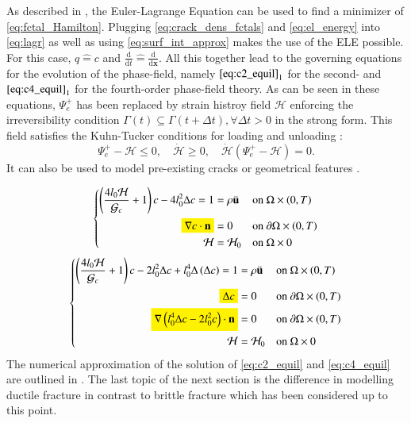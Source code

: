 As described in , the Euler-Lagrange Equation can be used to find a minimizer of \eqref{eq:fctal_Hamilton}. Plugging \eqref{eq:crack_dens_fctals} and \eqref{eq:el_energy} into \eqref{eq:lagr} as well as using \eqref{eq:surf_int_approx} makes the use of the ELE possible. For this case, $q\hat{=}c$ and $\frac{\mathrm{d}}{\mathrm{d}t}\hat{=}\frac{\mathrm{d}}{\mathrm{d}\mathbf{x}}$. All this together lead to the governing equations for the evolution of the phase-field, namely $\eqref{eq:c2_equil}_{1}$ for the second- and $\eqref{eq:c4_equil}_{1}$ for the fourth-order phase-field theory. As can be seen in these equations, $\Psi_{e}^{+}$ has been replaced by strain histroy field $\mathcal{H}$ enforcing the irreversibility condition $\Gamma\left(t\right)\subseteq\Gamma\left(t+\Delta t\right), \forall \Delta t>0$ in the strong form. This field satisfies the Kuhn-Tucker conditions for loading and unloading \cite{01_PF_dyn_brittle}:
\begin{equation} \label{eq:KuhnTucker}
	\Psi_{e}^{+}-\mathcal{H}\leq0, \quad \dot{\mathcal{H}}\geq0, \quad \dot{\mathcal{H}}\left(\Psi_{e}^{+}-\mathcal{H}\right)=0.
\end{equation}
It can also be used to model pre-existing cracks or geometrical features \cite{01_PF_dyn_brittle}.

 \hl{}
\begin{equation} \label{eq:c2_equil}
		 \left\{\begin{alignedat}{2}
\left(\frac{4l_{0}\mathcal{H}}{\mathcal{G}_{c}}+1\right)c - 4l_{0}^{2}\Delta c=1 &= \rho\ddot{\mathbf{u}} && \quad\text{on } \Omega\times\left(0,T\right) \\
\hl{\nabla c\cdot\mathbf{n}} &= 0 && \quad \text{on } \partial\Omega\times\left(0,T\right) \\
\mathcal{H} &= \mathcal{H}_{0} && \quad \text{on } \Omega\times0  
\end{alignedat}\right.
\end{equation}
\begin{equation} \label{eq:c4_equil}
		 \left\{\begin{alignedat}{2}
\left(\frac{4l_{0}\mathcal{H}}{\mathcal{G}_{c}}+1\right)c - 2l_{0}^{2}\Delta c + l_{0}^{4}\Delta\left(\Delta c\right)=1 &= \rho\ddot{\mathbf{u}} && \quad\text{on } \Omega\times\left(0,T\right) \\
\hl{\Delta c} &= 0 && \quad \text{on } \partial\Omega\times\left(0,T\right) \\
\hl{\nabla\left(l_{0}^{4}\Delta c-2l_{0}^{2}c\right)\cdot\mathbf{n}} &= 0 && \quad \text{on } \partial\Omega\times\left(0,T\right) \\
\mathcal{H} &= \mathcal{H}_{0} && \quad \text{on } \Omega\times0  
\end{alignedat}\right.
\end{equation}
The numerical approximation of the solution of \eqref{eq:c2_equil} and \eqref{eq:c4_equil} are outlined in . The last topic of the next section is the difference in modelling ductile fracture in contrast to brittle fracture which has been considered up to this point.


